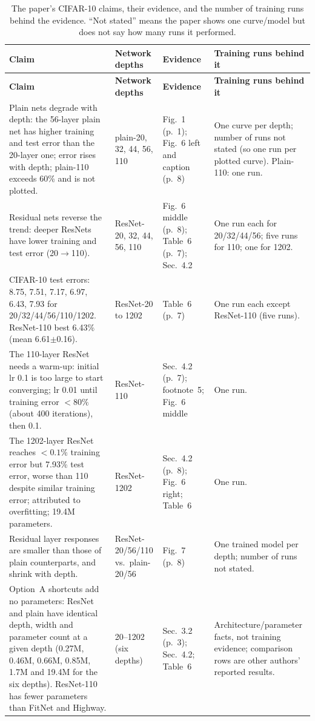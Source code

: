 \documentclass[11pt,a4paper]{article}
\begin{document}
{\footnotesize
\begin{longtable}{@{}p{4.5cm}p{2.9cm}p{3.5cm}p{4.3cm}@{}}
\caption{The paper's CIFAR-10 claims, their evidence, and the number of training runs behind the evidence. ``Not stated'' means the paper shows one curve/model but does not say how many runs it performed.}
\label{tab:claims}\\
\toprule
\textbf{Claim} & \textbf{Network depths} & \textbf{Evidence} & \textbf{Training runs behind it}\\
\midrule
\endfirsthead
\toprule
\textbf{Claim} & \textbf{Network depths} & \textbf{Evidence} & \textbf{Training runs behind it}\\
\midrule
\endhead
Plain nets degrade with depth: the 56-layer plain net has higher training and test error than the 20-layer one; error rises with depth; plain-110 exceeds 60\% and is not plotted.
& plain-20, 32, 44, 56, 110
& Fig.~1 (p.~1); Fig.~6 left and caption (p.~8)
& One curve per depth; number of runs not stated (so one run per plotted curve). Plain-110: one run.\\
Residual nets reverse the trend: deeper ResNets have lower training and test error (20$\to$110).
& ResNet-20, 32, 44, 56, 110
& Fig.~6 middle (p.~8); Table~6 (p.~7); Sec.~4.2
& One run each for 20/32/44/56; five runs for 110; one for 1202.\\
CIFAR-10 test errors: 8.75, 7.51, 7.17, 6.97, 6.43, 7.93 for 20/32/44/56/110/1202. ResNet-110 best 6.43\% (mean 6.61$\pm$0.16).
& ResNet-20 to 1202
& Table~6 (p.~7)
& One run each except ResNet-110 (five runs).\\
The 110-layer ResNet needs a warm-up: initial lr 0.1 is too large to start converging; lr 0.01 until training error $<80\%$ (about 400 iterations), then 0.1.
& ResNet-110
& Sec.~4.2 (p.~7); footnote~5; Fig.~6 middle
& One run.\\
The 1202-layer ResNet reaches $<0.1\%$ training error but 7.93\% test error, worse than 110 despite similar training error; attributed to overfitting; 19.4M parameters.
& ResNet-1202
& Sec.~4.2 (p.~8); Fig.~6 right; Table~6
& One run.\\
Residual layer responses are smaller than those of plain counterparts, and shrink with depth.
& ResNet-20/56/110 vs.\ plain-20/56
& Fig.~7 (p.~8)
& One trained model per depth; number of runs not stated.\\
Option~A shortcuts add no parameters: ResNet and plain have identical depth, width and parameter count at a given depth (0.27M, 0.46M, 0.66M, 0.85M, 1.7M and 19.4M for the six depths). ResNet-110 has fewer parameters than FitNet and Highway.
& 20--1202 (six depths)
& Sec.~3.2 (p.~3); Sec.~4.2; Table~6
& Architecture/parameter facts, not training evidence; comparison rows are other authors' reported results.\\
\bottomrule
\end{longtable}
}
\end{document}
